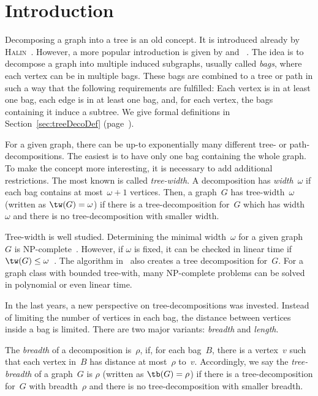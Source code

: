 \chapter{Introduction}
    \label{cha:intro}
%

Decomposing a graph into a tree is an old concept.
It is introduced already by \textsc{Halin}~\cite{Halin1976}.
However, a more popular introduction is given by  and ~\cite{RobertSeymou1983,RobertSeymou1984}.
The idea is to decompose a graph into multiple induced subgraphs, usually called \emph{bags}, where each vertex can be in multiple bags.
These bags are combined to a tree or path in such a way that the following requirements are fulfilled:
Each vertex is in at least one bag, each edge is in at least one bag, and, for each vertex, the bags containing it induce a subtree.
We give formal definitions in Section~\ref{sec:treeDecoDef} (page~\pageref{sec:treeDecoDef}).

For a given graph, there can be up-to exponentially many different tree- or path-decompositions.
The easiest is to have only one bag containing the whole graph.
To make the concept more interesting, it is necessary to add additional restrictions.
The most known is called \emph{tree-width}.
A decomposition has \emph{width}~$\omega$ if each bag contains at most~$\omega + 1$ vertices.
Then, a graph~$G$ has tree-width~$\omega$ (written as $\tw(G) = \omega$) if there is a tree-decomposition for~$G$ which has width~$\omega$ and there is no tree-decomposition with smaller width.

Tree-width is well studied.
Determining the minimal width~$\omega$ for a given graph~$G$ is NP-complete~\cite{ArnbCornPros1987}.
However, if $\omega$ is fixed, it can be checked in linear time if $\tw(G) \leq \omega$~\cite{Bodlae1996}.
The algorithm in~\cite{Bodlae1996} also creates a tree decomposition for~$G$.
For a graph class with bounded tree-with, many NP-complete problems can be solved in polynomial or even linear time.

In the last years, a new perspective on tree-decompositions was invested.
Instead of limiting the number of vertices in each bag, the distance between vertices inside a bag is limited.
There are two major variants: \emph{breadth} and \emph{length}.

The \emph{breadth} of a decomposition is~$\rho$, if, for each bag~$B$, there is a vertex~$v$ such that each vertex in~$B$ has distance at most~$\rho$ to~$v$.
Accordingly, we say the \emph{tree-breadth} of a graph~$G$ is $\rho$ (written as $\tb(G) = \rho$) if there is a tree-decomposition for~$G$ with breadth~$\rho$ and there is no tree-decomposition with smaller breadth.

